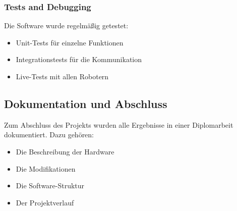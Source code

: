 \subsubsection{Tests and Debugging}
Die Software wurde regelmäßig getestet:
\begin{itemize}
    \item Unit-Tests für einzelne Funktionen
    \item Integrationstests für die Kommunikation
    \item Live-Tests mit allen Robotern
\end{itemize}
\subsection{Dokumentation und Abschluss}
Zum Abschluss des Projekts wurden alle Ergebnisse in einer Diplomarbeit dokumentiert.
Dazu gehören:
\begin{itemize}
    \item Die Beschreibung der Hardware
    \item Die Modifikationen
    \item Die Software-Struktur
    \item Der Projektverlauf
\end{itemize}

